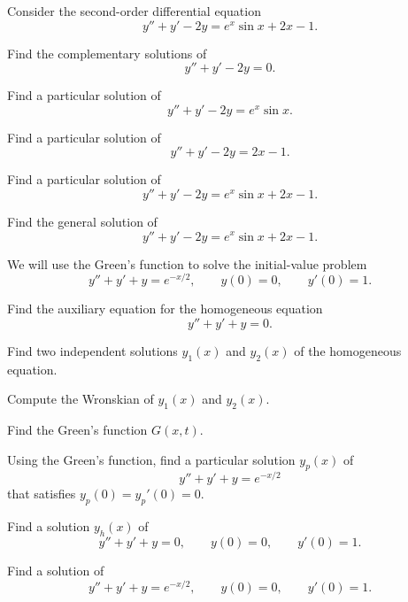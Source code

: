 \begin{problem}
Consider the second-order differential equation
\[
y''+y'-2y=e^x\sin x+2x-1.
\]
\begin{problemsubparts}
\item Find the complementary solutions of
\[
y''+y'-2y=0.
\]
\item Find a particular solution of
\[
y''+y'-2y=e^x\sin x.
\]
\item Find a particular solution of
\[
y''+y'-2y=2x-1.
\]
\item Find a particular solution of
\[
y''+y'-2y=e^x\sin x+2x-1.
\]
\item Find the general solution of
\[
y''+y'-2y=e^x\sin x+2x-1.
\]
\end{problemsubparts}
\end{problem}

\begin{problem}
We will use the Green's function to solve the initial-value problem
\[
y''+y'+y=e^{-x/2},
\qquad
y(0)=0,
\qquad
y'(0)=1.
\]
\begin{problemsubparts}
\item Find the auxiliary equation for the homogeneous equation
\[
y''+y'+y=0.
\]
\item Find two independent solutions $y_1(x)$ and $y_2(x)$ of the homogeneous equation.
\item Compute the Wronskian of $y_1(x)$ and $y_2(x)$.
\item Find the Green's function $G(x,t)$.
\item Using the Green's function, find a particular solution $y_p(x)$ of
\[
y''+y'+y=e^{-x/2}
\]
that satisfies $y_p(0)=y_p'(0)=0$.
\item Find a solution $y_h(x)$ of
\[
y''+y'+y=0,
\qquad
y(0)=0,
\qquad
y'(0)=1.
\]
\item Find a solution of
\[
y''+y'+y=e^{-x/2},
\qquad
y(0)=0,
\qquad
y'(0)=1.
\]
\end{problemsubparts}
\end{problem}


